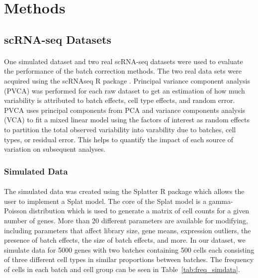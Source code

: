 \documentclass[
12pt, %
letterpaper, %
oneside, %
headinclude,footinclude, %
BCOR5mm, %
]{scrartcl}
\begin{document}
\section{Methods}

\subsection{scRNA-seq Datasets}

\paragraph*{}
One simulated dataset and two real scRNA-seq datasets were used to evaluate the performance of the batch correction methods. The two real data sets were acquired using the scRNAseq R package \citep{risso2022scRNAseq}. Principal variance component analysis (PVCA) \citep{li2009principal} was performed for each raw dataset to get an estimation of how much variability is attributed to batch effects, cell type effects, and random error. PVCA uses principal components from PCA and variance components analysis (VCA) to fit a mixed linear model using the factors of interest as random effects to partition the total observed variability into varability due to batches, cell types, or residual error. This helps to quantify the impact of each source of variation on subsequent analyses.

\subsubsection*{Simulated Data}

\paragraph*{}
The simulated data was created using the Splatter R package \citep{zappia2017splatter} which allows the user to implement a Splat model. The core of the Splat model is a gamma-Poisson distribution which is used to generate a matrix of cell counts for a given number of genes. More than 20 different parameters are available for modifying, including parameters that affect library size, gene means, expression outliers, the presence of batch effects, the size of batch effects, and more. In our dataset, we simulate data for 5000 genes with two batches containing 500 cells each consisting of three different cell types in similar proportions between batches. The frequency of cells in each batch and cell group can be seen in Table~\ref{tab:freq_simdata}.
\end{document}

